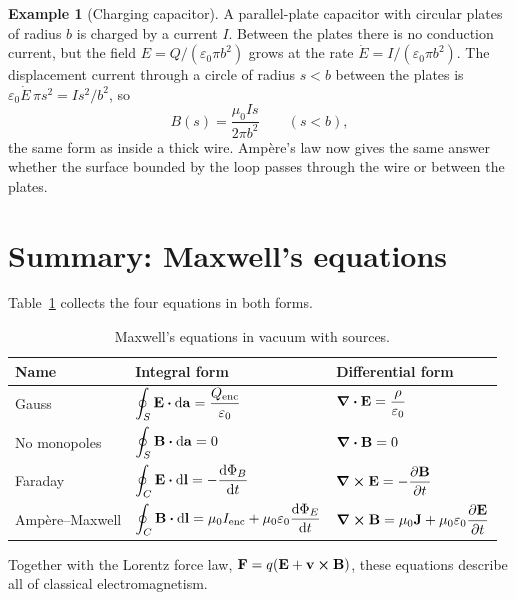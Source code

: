 \documentclass[11pt,a4paper]{article}
\theoremstyle{definition}
\newtheorem{example}{Example}[section]
\theoremstyle{remark}
\newcommand{\E}{\vb{E}}
\newcommand{\B}{\vb{B}}
\newcommand{\J}{\vb{J}}
\newcommand{\eps}{\varepsilon_0}
\begin{document}
\begin{example}[Charging capacitor]
A parallel-plate capacitor with circular plates of radius $b$ is charged by a current $I$. Between the plates there is no conduction current, but the field $E = Q/(\eps \pi b^2)$ grows at the rate $\dot{E} = I/(\eps\pi b^2)$. The displacement current through a circle of radius $s < b$ between the plates is $\eps\dot{E}\,\pi s^2 = I s^2/b^2$, so
\[
  B(s) = \frac{\mu_0 I s}{2\pi b^2} \qquad (s < b),
\]
the same form as inside a thick wire. Ampère's law now gives the same answer whether the surface bounded by the loop passes through the wire or between the plates.
\end{example}

\section{Summary: Maxwell's equations}
\label{sec:summary}

Table~\ref{tab:maxwell} collects the four equations in both forms.

\begin{table}[ht]
  \centering
  \caption{Maxwell's equations in vacuum with sources.}
  \label{tab:maxwell}
  \renewcommand{\arraystretch}{1.6}
  \begin{tabular}{@{}lll@{}}
    \toprule
    Name & Integral form & Differential form \\
    \midrule
    Gauss & $\displaystyle\oint_S \E\vdot\dd{\vb{a}} = \frac{Q_\text{enc}}{\eps}$ & $\displaystyle\div{\E} = \frac{\rho}{\eps}$ \\
    No monopoles & $\displaystyle\oint_S \B\vdot\dd{\vb{a}} = 0$ & $\div{\B} = 0$ \\
    Faraday & $\displaystyle\oint_C \E\vdot\dd{\vb{l}} = -\dv{\Phi_B}{t}$ & $\displaystyle\curl{\E} = -\pdv{\B}{t}$ \\
    Ampère--Maxwell & $\displaystyle\oint_C \B\vdot\dd{\vb{l}} = \mu_0 I_\text{enc} + \mu_0\eps\dv{\Phi_E}{t}$ & $\displaystyle\curl{\B} = \mu_0\J + \mu_0\eps\pdv{\E}{t}$ \\
    \bottomrule
  \end{tabular}
\end{table}

Together with the Lorentz force law, $\vb{F} = q(\E + \vb{v}\cross\B)$, these equations describe all of classical electromagnetism.

\end{document}

